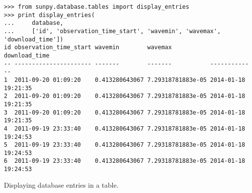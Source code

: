 \begin{listing}
\begin{verbatim}
>>> from sunpy.database.tables import display_entries
>>> print display_entries(
...     database,
...     ['id', 'observation_time_start', 'wavemin', 'wavemax', 'download_time'])
id observation_time_start wavemin        wavemax           download_time      
-- ---------------------- -------        -------           -------------      
1  2011-09-20 01:09:20    0.413280643067 7.29318781883e-05 2014-01-18 19:21:35
2  2011-09-20 01:09:20    0.413280643067 7.29318781883e-05 2014-01-18 19:21:35
3  2011-09-20 01:09:20    0.413280643067 7.29318781883e-05 2014-01-18 19:21:35
4  2011-09-19 23:33:40    0.413280643067 7.29318781883e-05 2014-01-18 19:24:53
5  2011-09-19 23:33:40    0.413280643067 7.29318781883e-05 2014-01-18 19:24:53
6  2011-09-19 23:33:40    0.413280643067 7.29318781883e-05 2014-01-18 19:24:53
\end{verbatim}
\caption{Displaying database entries in a table.}
\label{code:db_2}
\end{listing}
